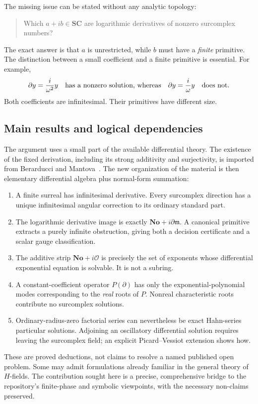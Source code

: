 \documentclass[11pt,letterpaper]{article}
\numberwithin{equation}{section}
\theoremstyle{definition}
\theoremstyle{remark}
\newcommand{\No}{\mathbf{No}}
\newcommand{\SC}{\mathbf{SC}}
\newcommand{\OO}{\mathcal O}
\newcommand{\mm}{\mathfrak m}
\newcommand{\der}{\partial}
\begin{document}
The missing issue can be stated without any analytic topology:
\begin{quote}
Which $a+ib\in\SC$ are logarithmic derivatives of nonzero surcomplex numbers?
\end{quote}
The exact answer is that $a$ is unrestricted, while $b$ must have a \emph{finite} primitive. The distinction between a small coefficient and a finite primitive is essential. For example,
\[
 \der y=\frac{i}{\omega^2}y
 \quad\hbox{has a nonzero solution, whereas}\quad
 \der y=\frac{i}{\omega}y
 \quad\hbox{does not.}
\]
Both coefficients are infinitesimal. Their primitives have different size.

\subsection{Main results and logical dependencies}
The argument uses a small part of the available differential theory. The existence of the fixed derivation, including its strong additivity and surjectivity, is imported from Berarducci and Mantova~\cite{BM}. The new organization of the material is then elementary differential algebra plus normal-form summation:
\begin{enumerate}
\item A finite surreal has infinitesimal derivative. Every surcomplex direction has a unique infinitesimal angular correction to its ordinary standard part.
\item The logarithmic derivative image is exactly $\No+i\der\mm$. A canonical primitive extracts a purely infinite obstruction, giving both a decision certificate and a scalar gauge classification.
\item The additive strip $\No+i\OO$ is precisely the set of exponents whose differential exponential equation is solvable. It is not a subring.
\item A constant-coefficient operator $P(\der)$ has only the exponential-polynomial modes corresponding to the \emph{real} roots of $P$. Nonreal characteristic roots contribute no surcomplex solutions.
\item Ordinary-radius-zero factorial series can nevertheless be exact Hahn-series particular solutions. Adjoining an oscillatory differential solution requires leaving the surcomplex field; an explicit Picard--Vessiot extension shows how.
\end{enumerate}

These are proved deductions, not claims to resolve a named published open problem. Some may admit formulations already familiar in the general theory of $H$-fields. The contribution sought here is a precise, comprehensive bridge to the repository's finite-phase and symbolic viewpoints, with the necessary non-claims preserved.
\end{document}
